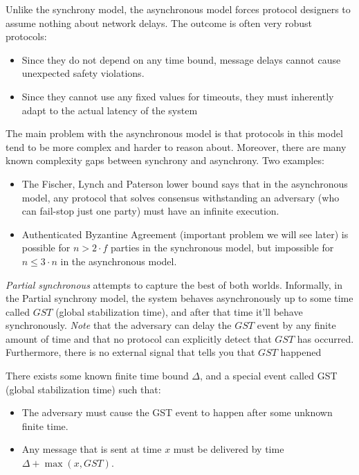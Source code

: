 Unlike the synchrony model, 
the asynchronous model forces protocol designers to assume nothing about network delays.
The outcome is often very robust protocols:

\begin{itemize}
    \item Since they do not depend on any time bound, message delays 
    cannot cause unexpected safety violations.
    \item Since they cannot use any fixed values for timeouts, 
    they must inherently adapt to the actual latency of the system
\end{itemize}

The main problem with the asynchronous model is that protocols in this model tend to be more
complex and harder to reason about. 
Moreover, there are many known complexity gaps between synchrony and asynchrony. Two examples:

\begin{itemize}
    \item The Fischer, Lynch and Paterson \cite[FLP, 1985]{flp} lower bound says 
    that in the asynchronous model, any protocol that solves consensus 
    withstanding an adversary (who can fail-stop just one party) must have an infinite execution.
    \item Authenticated Byzantine Agreement (important problem we will see later) is possible for 
    $n>2\cdot f$ parties in the synchronous model, but impossible for $n \le3\cdot n$ in the asynchronous model.
\end{itemize}




\emph{Partial synchronous} attempts to capture the best of both worlds.
Informally, in the Partial synchrony model, the system behaves asynchronously 
up to some time called $GST$ (global stabilization time), and after that time it'll behave synchronously.
\emph{Note} that the adversary can delay the $GST$ event by any finite amount
of time and that no protocol can explicitly detect that $GST$ has occurred.
Furthermore, there is no external signal that tells you that $GST$ happened

\begin{definition}
    There exists some known finite time bound $\Delta$,
    and a special event called GST (global stabilization time) such that:
    \begin{itemize}
        \item The adversary must cause the GST event to happen after 
        some unknown finite time.
        \item Any message that is sent at time $x$ must be delivered by 
        time $\Delta+\max\left(x,GST\right)$.
    \end{itemize}
\end{definition}


